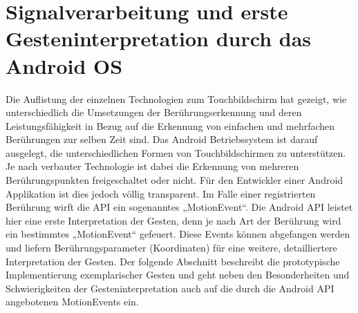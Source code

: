 \documentclass[12pt,oneside,a4paper,bibtotoc,liststotoc]{scrreprt}
\begin{document}
\section{Signalverarbeitung und erste Gesteninterpretation durch das Android OS}
Die Auflistung der einzelnen Technologien zum Touchbildschirm hat gezeigt, wie unterschiedlich die Umsetzungen der Berührungserkennung und deren Leistungsfähigkeit in Bezug auf die Erkennung von einfachen und mehrfachen Berührungen zur selben Zeit sind. Das Android Betriebssystem ist darauf ausgelegt, die unterschiedlichen Formen von Touchbildschirmen zu unterstützen. Je nach verbauter Technologie ist dabei die Erkennung von mehreren Berührungspunkten freigeschaltet oder nicht. Für den Entwickler einer Android Applikation ist dies jedoch völlig transparent. Im Falle einer registrierten Berührung wirft die API ein sogenanntes „MotionEvent“. Die Android API leistet hier eine erste Interpretation der Gesten, denn je nach Art der Berührung wird ein bestimmtes „MotionEvent“ gefeuert. Diese Events können abgefangen werden und liefern Berührungsparameter (Koordinaten) für eine weitere, detailliertere Interpretation der Gesten.
Der folgende Abschnitt beschreibt die prototypische Implementierung exemplarischer Gesten und geht neben den Besonderheiten und Schwierigkeiten der Gesteninterpretation auch auf die durch die Android API angebotenen MotionEvents ein.
\end{document}
